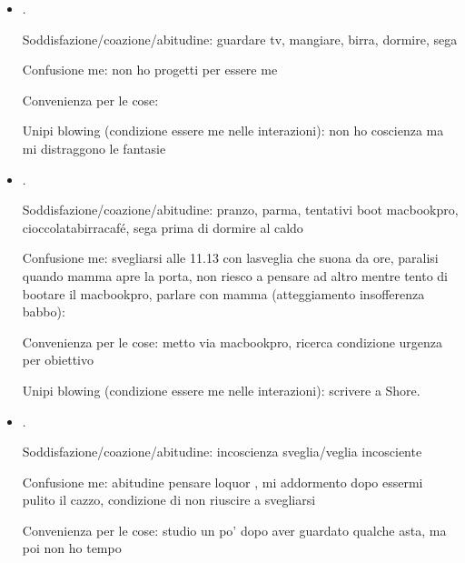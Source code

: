 \begin{itemize}
Soddisfazione/coazione/abitudine: colazione, prendere pdb, 

Confusione me (non so cosa fare):distro probabilit\'a-IMF, seguire ASD e ad un certo punto non capire

Spreco tempo interno (hhmm per\'o!, mi rilasso perch\'e mi ha sorriso ...): impulsi confusione post birra, sonno post pranzo/noia/afflizione-impotenza

Convenienza per le cose: pdb, guardare ragazze, 

Unipi blowing (condizione essere me nelle interazioni): ciclo rabbia/noia (un po' inutile)

\item {}.

Soddisfazione/coazione/abitudine: guardare tv, mangiare, birra, dormire, sega

Confusione me: non ho progetti per essere me

Convenienza per le cose: 

Unipi blowing (condizione essere me nelle interazioni): non ho coscienza ma mi distraggono le fantasie

\item {}.

Soddisfazione/coazione/abitudine: pranzo, parma, tentativi boot macbookpro, cioccolatabirracaf\'e, sega prima di dormire al caldo

Confusione me: svegliarsi alle 11.13 con lasveglia che suona da ore, paralisi quando mamma apre la porta, non riesco a pensare ad altro mentre tento di bootare il macbookpro, parlare con mamma (atteggiamento insofferenza babbo): 

Convenienza per le cose: metto via macbookpro, ricerca condizione urgenza per obiettivo

Unipi blowing (condizione essere me nelle interazioni): scrivere a Shore.

\item {}.

Soddisfazione/coazione/abitudine: incoscienza sveglia/veglia incosciente

Confusione me: abitudine pensare loquor , mi addormento dopo essermi pulito il cazzo, condizione di non riuscire a svegliarsi

Convenienza per le cose: studio un po' dopo aver guardato qualche asta, ma poi non ho tempo


\end{itemize}
